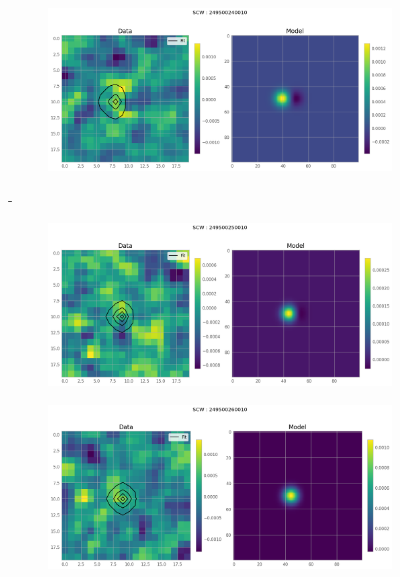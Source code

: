 \documentclass[
	a4paper, %
	10pt, %
	unnumberedsections, %
	twoside, %
]{LTJournalArticle}
\begin{document}
    \begin{figure}[H]
    \centering
    \begin{subfigure}{.47\textwidth}
        \includegraphics[width=\textwidth]{report/Figures/models/2404/24_psf_notconst.png}
    \end{subfigure}%
    \hspace{1em}-
    \begin{subfigure}{.47\textwidth}
        \centering
        \includegraphics[width=\textwidth]{report/Figures/models/2404/25_psf_notconst.png}
    \end{subfigure}
    \begin{subfigure}{.47\textwidth}
        \centering
        \includegraphics[width=\textwidth]{report/Figures/models/2404/26_psf_notconst.png}

\end{subfigure}
\end{figure}
\end{document}
